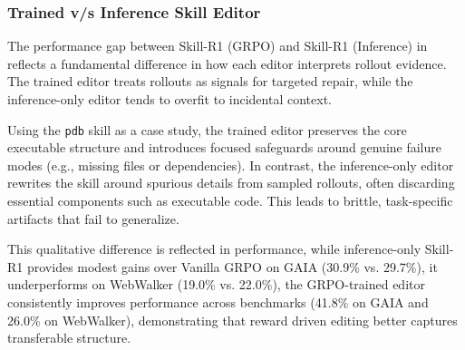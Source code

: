 
\subsubsection{Trained v/s Inference Skill Editor}

The performance gap between Skill-R1 (GRPO) and Skill-R1 (Inference) in  reflects a fundamental difference in how each editor interprets rollout evidence. The trained editor treats rollouts as signals for targeted repair, while the inference-only editor tends to overfit to incidental context.

Using the \texttt{pdb} skill as a case study, the trained editor preserves the core executable structure and introduces focused safeguards around genuine failure modes (e.g., missing files or dependencies). In contrast, the inference-only editor rewrites the skill around spurious details from sampled rollouts, often discarding essential components such as executable code. This leads to brittle, task-specific artifacts that fail to generalize.

This qualitative difference is reflected in performance, while inference-only Skill-R1 provides modest gains over Vanilla GRPO on GAIA (30.9\% vs. 29.7\%), it underperforms on WebWalker (19.0\% vs. 22.0\%), the GRPO-trained editor consistently improves performance across benchmarks (41.8\% on GAIA and 26.0\% on WebWalker), demonstrating that reward driven editing better captures transferable structure.

